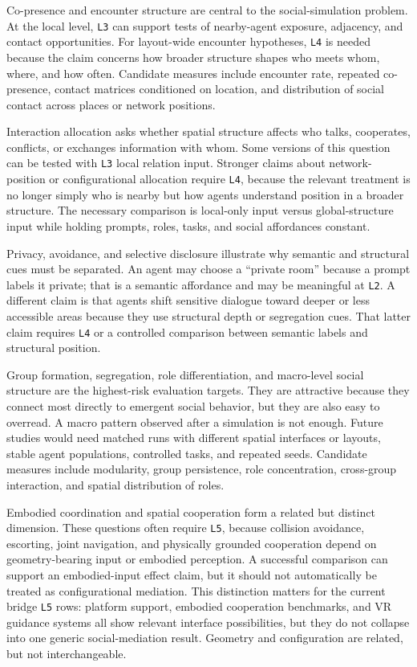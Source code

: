 \documentclass[
  twocolumn]{article}
\begin{document}
Co-presence and encounter structure are central to the social-simulation
problem. At the local level, \texttt{L3} can support tests of
nearby-agent exposure, adjacency, and contact opportunities. For
layout-wide encounter hypotheses, \texttt{L4} is needed because the
claim concerns how broader structure shapes who meets whom, where, and
how often. Candidate measures include encounter rate, repeated
co-presence, contact matrices conditioned on location, and distribution
of social contact across places or network positions.

Interaction allocation asks whether spatial structure affects who talks,
cooperates, conflicts, or exchanges information with whom. Some versions
of this question can be tested with \texttt{L3} local relation input.
Stronger claims about network-position or configurational allocation
require \texttt{L4}, because the relevant treatment is no longer simply
who is nearby but how agents understand position in a broader structure.
The necessary comparison is local-only input versus global-structure
input while holding prompts, roles, tasks, and social affordances
constant.

Privacy, avoidance, and selective disclosure illustrate why semantic and
structural cues must be separated. An agent may choose a ``private
room'' because a prompt labels it private; that is a semantic affordance
and may be meaningful at \texttt{L2}. A different claim is that agents
shift sensitive dialogue toward deeper or less accessible areas because
they use structural depth or segregation cues. That latter claim
requires \texttt{L4} or a controlled comparison between semantic labels
and structural position.

Group formation, segregation, role differentiation, and macro-level
social structure are the highest-risk evaluation targets. They are
attractive because they connect most directly to emergent social
behavior, but they are also easy to overread. A macro pattern observed
after a simulation is not enough. Future studies would need matched runs
with different spatial interfaces or layouts, stable agent populations,
controlled tasks, and repeated seeds. Candidate measures include
modularity, group persistence, role concentration, cross-group
interaction, and spatial distribution of roles.

Embodied coordination and spatial cooperation form a related but
distinct dimension. These questions often require \texttt{L5}, because
collision avoidance, escorting, joint navigation, and physically
grounded cooperation depend on geometry-bearing input or embodied
perception. A successful comparison can support an embodied-input effect
claim, but it should not automatically be treated as configurational
mediation. This distinction matters for the current bridge \texttt{L5}
rows: platform support, embodied cooperation benchmarks, and VR guidance
systems all show relevant interface possibilities, but they do not
collapse into one generic social-mediation result. Geometry and
configuration are related, but not interchangeable.
\end{document}
